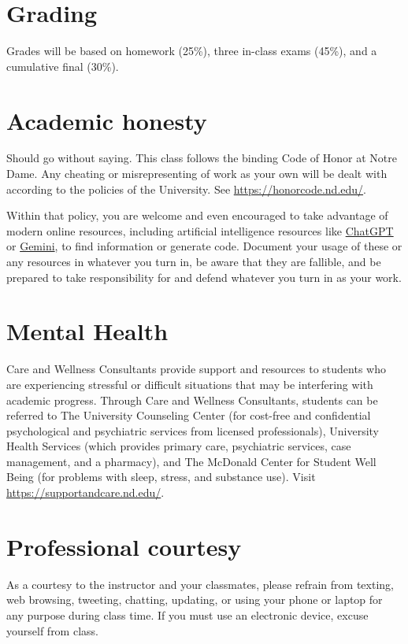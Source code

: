\documentclass[11pt]{article}
\begin{document}
\section{Grading}
\label{sec:org93a41a2}
Grades will be based on homework (25\%), three in-class exams (45\%), and a cumulative final (30\%).
\section{Academic honesty}
\label{sec:org53a4139}
Should go without saying. This class follows the binding Code of Honor at Notre Dame.  Any cheating or misrepresenting of work as your own will be dealt with according to the policies of the University.  See \url{https://honorcode.nd.edu/}.

Within that policy, you are welcome and even encouraged to take advantage of modern online resources, including artificial intelligence resources like \href{https://chatgpt.comm}{ChatGPT} or \href{https://gemini.google.com/app}{Gemini}, to find information or generate code. Document your usage of these or any resources in whatever you turn in, be aware that they are fallible, and be prepared to take responsibility for and defend whatever you turn in as your work.
\section{Mental Health}
\label{sec:org3e5810f}
Care and Wellness Consultants provide
support and resources to students who are experiencing stressful or difficult
situations that may be interfering with academic progress. Through Care and
Wellness Consultants, students can be referred to The University Counseling
Center (for cost-free and confidential psychological and psychiatric services from
licensed professionals), University Health Services (which provides primary care,
psychiatric services, case management, and a pharmacy), and The McDonald
Center for Student Well Being (for problems with sleep, stress, and substance
use). Visit \href{https://supportandcare.nd.edu/}{https://supportandcare.nd.edu/}.
\section{Professional courtesy}
\label{sec:orgf9eddef}
As a courtesy to the instructor and your classmates, please refrain from
texting, web browsing, tweeting, chatting, updating, or using your phone or laptop for any
purpose during class time.  If you must use an electronic device, excuse
yourself from class.
\end{document}
